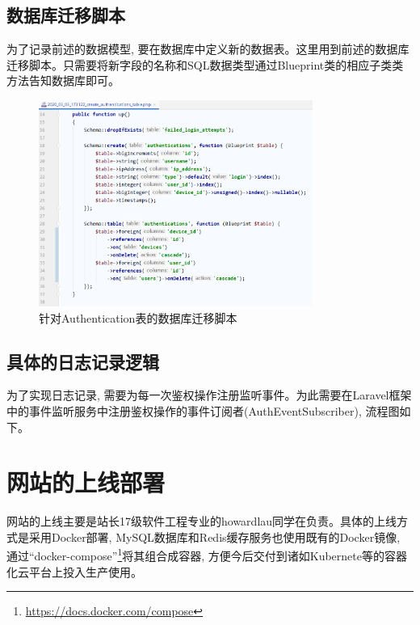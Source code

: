 

\subsection{数据库迁移脚本}

为了记录前述的数据模型, 要在数据库中定义新的数据表。这里用到前述的数据库迁移脚本。只需要将新字段的名称和SQL数据类型通过Blueprint类的相应子类类方法告知数据库即可。

\begin{figure}[h]
    \centering
    \includegraphics[width=0.8\textwidth]{support-files/4.6.1-migration-script.png}
    \caption{针对Authentication表的数据库迁移脚本}
    \label{fig:authmigratescript}
\end{figure}


\subsection{具体的日志记录逻辑}

为了实现日志记录, 需要为每一次鉴权操作注册监听事件。为此需要在Laravel框架中的事件监听服务中注册鉴权操作的事件订阅者(AuthEventSubscriber), 流程图如下。



\section{网站的上线部署}

网站的上线主要是站长17级软件工程专业的howardlau同学在负责。具体的上线方式是采用Docker部署, MySQL数据库和Redis缓存服务也使用既有的Docker镜像, 通过``docker-compose''\footnote{\url{https://docs.docker.com/compose}}将其组合成容器, 方便今后交付到诸如Kubernete等的容器化云平台上投入生产使用。


